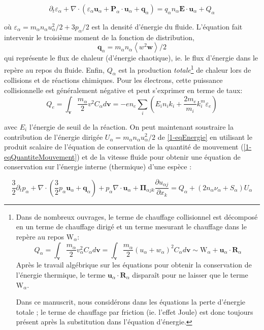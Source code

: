 \begin{refsection}
\begin{equation}
\label{1-eqEnergie}
\partial_t \varepsilon_\alpha+
\nabla\cdot\left(\varepsilon_\alpha\mathbf{u}_\alpha+\mathbf
P_\alpha\cdot\mathbf{u}_\alpha + \mathbf q_\alpha\right) =q_\alpha
n_\alpha\mathbf E\cdot
\mathbf{u}_\alpha+Q_\alpha
\end{equation}

où $\varepsilon_\alpha=m_\alpha n_\alpha u_\alpha^2/2+3p_\alpha/2$ est
la densité d'énergie du fluide. L'équation fait intervenir le troisième moment
de la fonction de distribution, $$\mathbf q_\alpha=m_\alpha
n_\alpha\left<w^2\mathbf w\right>/2$$ qui représente le flux de chaleur
(d'énergie chaotique), ie. le flux d'énergie dans le repère au repos du fluide. 
Enfin, $Q_\alpha$ est la production \emph{totale}\footnote{Dans de nombreux ouvrages, le terme de chauffage
collisionnel est décomposé en un terme de chauffage dirigé et un terme mesurant
le chauffage dans le repère au repos $\text{W}_\alpha$: $$Q_\alpha=\int_{\mathbf
v}\frac{m_\alpha}{2}v_\alpha^2C_\alpha d\mathbf v=\int_{\mathbf
v}\frac{m_\alpha}{2}(u_\alpha+w_\alpha)^2C_\alpha d\mathbf
v\sim\text{W}_\alpha+\mathbf u_\alpha\cdot\mathbf R_\alpha $$ Après le travail
algébrique sur les équations pour obtenir la conservation de l'énergie
thermique, le terme $\mathbf u_\alpha\cdot\mathbf R_\alpha$ disparaît pour
ne laisser que le terme $\text{W}_\alpha$. 

Dans ce manuscrit, nous
considérons dans les équations la perte d'énergie totale ; le terme de
chauffage par friction (ie. l'effet Joule) est donc toujours présent après la
substitution dans l'équation d'énergie.} de chaleur lors de collisions et de
réactions chimiques.
Pour les électrons, cette puissance collisionnelle est généralement négative et peut s'exprimer en terme de taux:
\begin{equation}
	Q_e=\int_{\mathbf
	v}\frac{m_\alpha}{2}v^2C_\alpha d\mathbf
	v=-en_e\sum_{i}\left(E_in_ik_i+\frac{2m_e}{m_i}k^m_i\varepsilon_e\right)
\end{equation}

avec $E_i$ l'énergie de seuil de la réaction. On peut maintenant soustraire la
contribution de l'énergie dirigée $U_\alpha=m_\alpha n_\alpha u_\alpha^2/2$ de
\eqref{1-eqEnergie} en utilisant le produit scalaire de l'équation de
conservation de la quantité de mouvement (\eqref{1-eqQuantiteMouvement}) et de
la vitesse fluide pour obtenir une équation de conservation sur l'énergie
interne (thermique) d'une espèce :

\begin{equation}
\label{1-eqEnergieInterne}
\frac{3}{2}\partial_t p_\alpha + 
\nabla\cdot\left(\frac{3}{2}p_\alpha
\mathbf{u}_\alpha+\mathbf q_\alpha\right)+p_\alpha\nabla\cdot\mathbf u_\alpha
+\boldsymbol{\Pi}_{\alpha j k}\frac{\partial u_{\alpha j}}{\partial{x_k}} =
{Q_\alpha}+(2n_\alpha\nu_\alpha+S_\alpha)U_\alpha
\end{equation}


\end{refsection}
